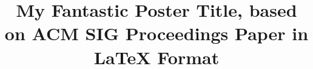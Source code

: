 \documentclass{acm_proc_article-sp}
\begin{document}
\title{My Fantastic Poster Title, based on {\ttlit ACM} SIG Proceedings Paper in LaTeX
Format}
%
%
%
%
%
\end{document}
